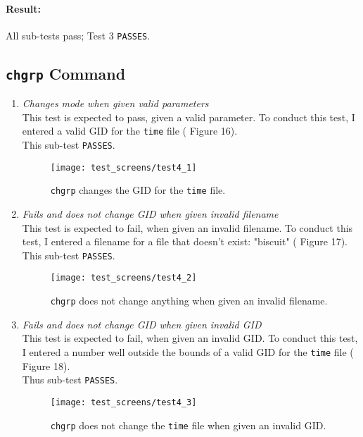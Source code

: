 \documentclass[11pt,letterpaper]{report}
\begin{document}
	\paragraph{Result:} All sub-tests pass; Test 3 {\tt PASSES}.\\
	
	
	\subsection{{\tt chgrp} Command}
	\begin{enumerate}
		\item \emph{Changes mode when given valid parameters}\\
		This test is expected to pass, given a valid parameter. To conduct this test, I entered a valid GID for the {\tt time} file ({\color{red} Figure 16}).\\
		This sub-test {\tt PASSES}.
		
		\begin{figure}
			\centering
			\texttt{[image: test\_screens/test4\_1]}
			\caption{{\tt chgrp} changes the GID for the {\tt time} file.}
			\label{fig:test41}
		\end{figure}
				
		\item \emph{Fails and does not change GID when given invalid filename}\\
		This test is expected to fail, when given an invalid filename. To conduct this test, I entered a filename for a file that doesn't exist: "biscuit" ({\color{red} Figure 17}).\\
		This sub-test {\tt PASSES}.
		
		\begin{figure}
			\centering
			\texttt{[image: test\_screens/test4\_2]}
			\caption{{\tt chgrp} does not change anything when given an invalid filename.}
			\label{fig:test42}
		\end{figure}
		
		
		\item \emph{Fails and does not change GID when given invalid GID}\\
		This test is expected to fail, when given an invalid GID. To conduct this test, I entered a number well outside the bounds of a valid GID for the {\tt time} file ({\color{red} Figure 18}).\\
		Thus sub-test {\tt PASSES}.
		
		\begin{figure}
			\centering
			\texttt{[image: test\_screens/test4\_3]}
			\caption{{\tt chgrp} does not change the {\tt time} file when given an invalid GID.}
			\label{fig:test43}
		\end{figure}
				
	\end{enumerate}
\end{document}
